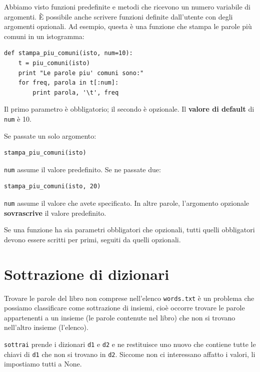 \documentclass[10pt]{book}
\begin{document}
Abbiamo visto funzioni predefinite e metodi che ricevono un numero variabile di argomenti. È possibile anche scrivere funzioni definite dall'utente con degli argomenti opzionali. Ad esempio, questa è una funzione che stampa le parole più comuni in un istogramma:

\begin{verbatim}
def stampa_piu_comuni(isto, num=10):
    t = piu_comuni(isto)
    print "Le parole piu' comuni sono:"
    for freq, parola in t[:num]:
        print parola, '\t', freq
\end{verbatim}

Il primo parametro è obbligatorio; il secondo è opzionale. Il {\bf valore di default} di {\tt num} è 10.

Se passate un solo argomento:

\begin{verbatim}
stampa_piu_comuni(isto)
\end{verbatim}

{\tt num} assume il valore predefinito. Se ne passate due:

\begin{verbatim}
stampa_piu_comuni(isto, 20)
\end{verbatim}

{\tt num} assume il valore che avete specificato. In altre parole, l'argomento opzionale {\bf sovrascrive} il valore predefinito.

Se una funzione ha sia parametri obbligatori che opzionali, tutti quelli obbligatori devono essere scritti per primi, seguiti da quelli opzionali.


\section{Sottrazione di dizionari}

Trovare le parole del libro non comprese nell'elenco {\tt words.txt} è un problema che possiamo classificare come sottrazione di insiemi, cioè occorre trovare le parole appartenenti a un insieme (le parole contenute nel libro) che non si trovano nell'altro insieme (l'elenco).

{\tt sottrai} prende i dizionari {\tt d1} e {\tt d2} e ne restituisce uno nuovo che contiene tutte le chiavi di {\tt d1} che non si trovano in {\tt d2}.  Siccome non ci interessano affatto i valori, li impostiamo tutti a None.
\end{document}
